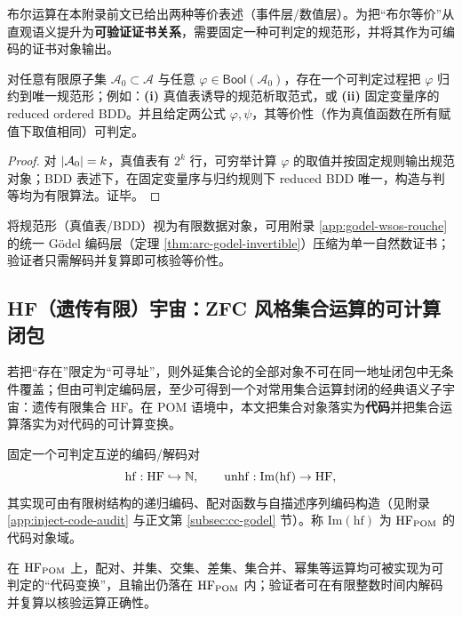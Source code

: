 布尔运算在本附录前文已给出两种等价表述（事件层/数值层）。为把“布尔等价”从直观语义提升为\textbf{可验证证书关系}，需要固定一种可判定的规范形，并将其作为可编码的证书对象输出。

\begin{proposition}[布尔规范形的存在性与可判定性]\label{prop:ops-bool-normal-form}
对任意有限原子集 $\mathcal{A}_0\subset\mathcal{A}$ 与任意 $\varphi\in\mathsf{Bool}(\mathcal{A}_0)$，存在一个可判定过程把 $\varphi$ 归约到唯一规范形；例如：\textbf{(i)} 真值表诱导的规范析取范式，或 \textbf{(ii)} 固定变量序的 reduced ordered BDD。并且给定两公式 $\varphi,\psi$，其等价性（作为真值函数在所有赋值下取值相同）可判定。
\end{proposition}

\begin{proof}
对 $\left\lvert \mathcal{A}_0\right\rvert=k$，真值表有 $2^k$ 行，可穷举计算 $\varphi$ 的取值并按固定规则输出规范对象；BDD 表述下，在固定变量序与归约规则下 reduced BDD 唯一，构造与判等均为有限算法。证毕。
\end{proof}

\begin{remark}[证书化与统一编码]
将规范形（真值表/BDD）视为有限数据对象，可用附录 \ref{app:godel-wsos-rouche} 的统一 Gödel 编码层（定理 \ref{thm:arc-godel-invertible}）压缩为单一自然数证书；验证者只需解码并复算即可核验等价性。
\end{remark}

\subsection{HF（遗传有限）宇宙：ZFC 风格集合运算的可计算闭包}\label{subsec:ops-hf}

若把“存在”限定为“可寻址”，则外延集合论的全部对象不可在同一地址闭包中无条件覆盖；但由可判定编码层，至少可得到一个对常用集合运算封闭的经典语义子宇宙：遗传有限集合 $\mathrm{HF}$。在 POM 语境中，本文把集合对象落实为\textbf{代码}并把集合运算落实为对代码的可计算变换。

\begin{definition}[HF 的代码语义域]\label{def:ops-hf-code}
固定一个可判定互逆的编码/解码对
$$
\mathrm{hf}:\mathrm{HF}\hookrightarrow \mathbb{N},\qquad \mathrm{unhf}:\mathrm{Im}(\mathrm{hf})\to\mathrm{HF},
$$
其实现可由有限树结构的递归编码、配对函数与自描述序列编码构造（见附录 \ref{app:inject-code-audit} 与正文第 \ref{subsec:cc-godel} 节）。称 $\mathrm{Im}(\mathrm{hf})$ 为 $\mathrm{HF}_{\mathrm{POM}}$ 的代码对象域。
\end{definition}

\begin{theorem}\label{thm:ops-hf-closure}
在 $\mathrm{HF}_{\mathrm{POM}}$ 上，配对、并集、交集、差集、集合并、幂集等运算均可被实现为可判定的“代码变换”，且输出仍落在 $\mathrm{HF}_{\mathrm{POM}}$ 内；验证者可在有限整数时间内解码并复算以核验运算正确性。
\end{theorem}

